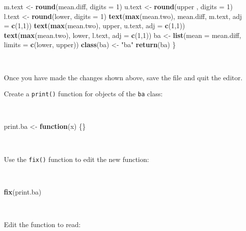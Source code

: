 \documentclass[12pt,a4paper]{book}
\newenvironment{Shaded}{\begin{snugshade}}{\end{snugshade}}
\newcommand{\ControlFlowTok}[1]{\textcolor[rgb]{0.13,0.29,0.53}{\textbf{#1}}}
\newcommand{\DataTypeTok}[1]{\textcolor[rgb]{0.13,0.29,0.53}{#1}}
\newcommand{\DecValTok}[1]{\textcolor[rgb]{0.00,0.00,0.81}{#1}}
\newcommand{\KeywordTok}[1]{\textcolor[rgb]{0.13,0.29,0.53}{\textbf{#1}}}
\newcommand{\NormalTok}[1]{#1}
\newcommand{\StringTok}[1]{\textcolor[rgb]{0.31,0.60,0.02}{#1}}
\theoremstyle{definition}
\theoremstyle{definition}
\theoremstyle{definition}
\theoremstyle{remark}
\begin{document}
\begin{Shaded}
\begin{Highlighting}[]
\NormalTok{  m.text <-}\StringTok{ }\KeywordTok{round}\NormalTok{(mean.diff, }\DataTypeTok{digits =} \DecValTok{1}\NormalTok{)}
\NormalTok{  u.text <-}\StringTok{ }\KeywordTok{round}\NormalTok{(upper , }\DataTypeTok{digits =} \DecValTok{1}\NormalTok{)}
\NormalTok{  l.text <-}\StringTok{ }\KeywordTok{round}\NormalTok{(lower, }\DataTypeTok{digits =} \DecValTok{1}\NormalTok{)}
  \KeywordTok{text}\NormalTok{(}\KeywordTok{max}\NormalTok{(mean.two), mean.diff, m.text, }\DataTypeTok{adj =} \KeywordTok{c}\NormalTok{(}\DecValTok{1}\NormalTok{,}\DecValTok{1}\NormalTok{)) }
  \KeywordTok{text}\NormalTok{(}\KeywordTok{max}\NormalTok{(mean.two), upper, u.text, }\DataTypeTok{adj =} \KeywordTok{c}\NormalTok{(}\DecValTok{1}\NormalTok{,}\DecValTok{1}\NormalTok{)) }
  \KeywordTok{text}\NormalTok{(}\KeywordTok{max}\NormalTok{(mean.two), lower, l.text, }\DataTypeTok{adj =} \KeywordTok{c}\NormalTok{(}\DecValTok{1}\NormalTok{,}\DecValTok{1}\NormalTok{))}
\NormalTok{  ba <-}\StringTok{ }\KeywordTok{list}\NormalTok{(}\DataTypeTok{mean =}\NormalTok{ mean.diff, }\DataTypeTok{limits =} \KeywordTok{c}\NormalTok{(lower, upper))}
  \KeywordTok{class}\NormalTok{(ba) <-}\StringTok{ "ba"}
  \KeywordTok{return}\NormalTok{(ba)}
\NormalTok{\}}
\end{Highlighting}
\end{Shaded}

~

Once you have made the changes shown above, save the file and quit the
editor.

Create a \texttt{print()} function for objects of the \texttt{ba} class:

~

\begin{Shaded}
\begin{Highlighting}[]
\NormalTok{print.ba <-}\StringTok{ }\ControlFlowTok{function}\NormalTok{(x) \{\}}
\end{Highlighting}
\end{Shaded}

~

Use the \texttt{fix()} function to edit the new function:

~

\begin{Shaded}
\begin{Highlighting}[]
\KeywordTok{fix}\NormalTok{(print.ba)}
\end{Highlighting}
\end{Shaded}

~

Edit the function to read:
\end{document}
